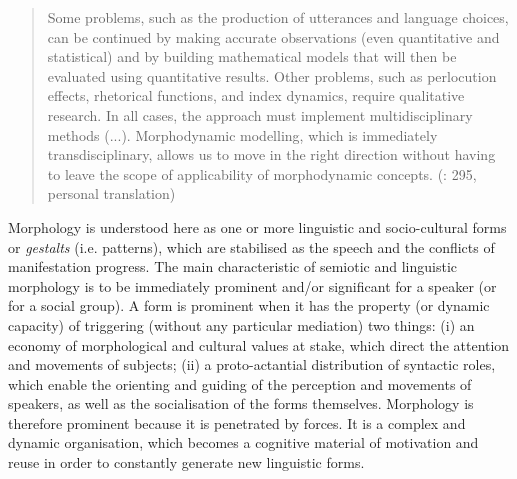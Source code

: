 \documentclass[output=paper]{langscibook}
\begin{document}
\begin{quote}\sloppy
Some problems, such as the production of utterances and language choices, can be continued by making accurate observations (even quantitative and statistical) and by building mathematical models that will then be evaluated using quantitative results. Other problems, such as perlocution effects, rhetorical functions, and index dynamics, require qualitative research. In all cases, the approach must implement multidisciplinary methods (...). Morphodynamic modelling, which is immediately transdisciplinary, allows us to move in the right direction without having to leave the scope of applicability of morphodynamic concepts. (\citealt{Wildgen1999}: 295, personal translation)
\end{quote}

Morphology is understood here as one or more linguistic and socio-cultural forms or \textit{gestalts} (i.e. patterns), which are stabilised as the speech and the conflicts of manifestation progress. The main characteristic of semiotic and linguistic morphology is to be immediately prominent and/or significant for a speaker (or for a social group). A form is prominent when it has the property (or dynamic capacity) of triggering (without any particular mediation) two things: (i) an economy of morphological and cultural values at stake, which direct the attention and movements of subjects; (ii) a proto-actantial distribution of syntactic roles, which enable the orienting and guiding of the perception and movements of speakers, as well as the socialisation of the forms themselves. Morphology is therefore prominent because it is penetrated by forces. It is a complex and dynamic organisation, which becomes a cognitive material of motivation and reuse in order to constantly generate new linguistic forms. 
\end{document}
